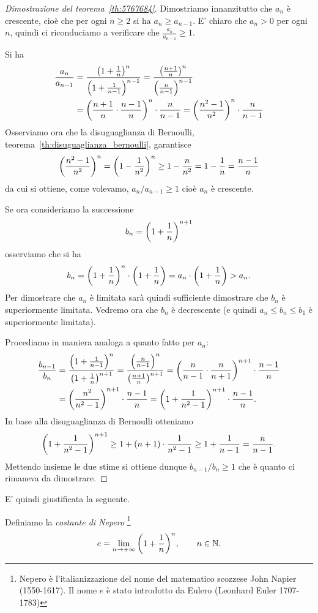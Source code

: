 \begin{proof}[Dimostrazione del teorema~\ref{th:5767684}]
Dimostriamo innanzitutto che $a_n$ è crescente, cioè che
per ogni $n\ge 2$ si ha $a_n \ge a_{n-1}$.
E' chiaro che $a_n>0$ per ogni $n$,
quindi ci riconduciamo a
verificare che $\frac{a_n}{a_{n-1}} \ge 1$.

Si ha
\begin{align*}
\frac{a_n}{a_{n-1}}
&= \frac{{\left( 1+\frac 1 n \right)}^n}{{\left( 1+\frac 1 {n-1} \right)}^{n-1}}
= \frac{{\left( \frac{n+1}{n} \right)}^n}{{\left( \frac{n}{n-1} \right)}^{n-1}}\\
&= {\left( \frac{n+1}{n}\cdot\frac{n-1}{n} \right)}^n \cdot \frac{n}{n-1}
= {\left( \frac{n^2- 1}{n^2} \right)}^n \cdot \frac{n}{n-1}
\end{align*}
Osserviamo ora che la disuguaglianza di Bernoulli, 
teorema~\ref{th:disuguaglianza_bernoulli},
garantisce
\[
  {\left( \frac{n^2 -1}{n^2} \right)}^n
  = {\left( 1-\frac{1}{n^2} \right)}^n
  \ge 1 - \frac{n}{n^2} = 1 - \frac{1}{n} = \frac{n-1}{n}
\]
da cui si ottiene, come volevamo, $a_n / a_{n-1} \ge 1$ cioè
$a_n$ è crescente.

Se ora consideriamo la successione
\[
  b_n = {\left( 1+\frac 1 n \right)}^{n+1}
\]
osserviamo che si ha
\[
  b_n = {\left( 1+\frac 1 n \right)}^n \cdot {\left( 1+\frac 1 n \right)}
   = a_n\cdot {\left( 1+\frac 1 n \right)} > a_n.
\]
Per dimostrare che $a_n$ è limitata sarà quindi sufficiente dimostrare
che $b_n$ è superiormente limitata. Vedremo ora che $b_n$ è decrescente (e quindi $a_n \le b_n \le b_1$ è superiormente limitata).

Procediamo in maniera analoga a quanto fatto per $a_n$:
\begin{align*}
\frac{b_{n-1}}{b_n}
& = \frac{{\left( 1+\frac{1}{n-1} \right)}^n}{{\left( 1+\frac{1}{n} \right)}^{n+1}}
  = \frac{{\left( \frac{n}{n-1} \right)}^n}{{\left( \frac{n+1}{n} \right)}^{n+1}}
  = {\left( \frac{n}{n-1}\cdot\frac{n}{n+1} \right)}^{n+1}\cdot\frac{n-1}{n} \\
& = {\left( \frac{n^2}{n^2-1} \right)}^{n+1} \cdot \frac{n-1}{n}
  = {\left( 1 + \frac{1}{n^2-1} \right)}^{n+1} \cdot \frac{n-1}{n}.
\end{align*}
In base alla disuguaglianza di Bernoulli otteniamo
\[
  {\left( 1 + \frac{1}{n^2-1} \right)}^{n+1}
  \ge 1 + (n+1) \cdot \frac{1}{n^2-1}
  \ge 1 + \frac{1}{n-1} = \frac{n}{n-1}.
\]
Mettendo insieme le due stime si ottiene dunque $b_{n-1}/b_n \ge 1$
che è quanto ci rimaneva da dimostrare.
\end{proof}

E' quindi giustificata la seguente.

\begin{definition}
\mymark{***}
Definiamo la \emph{costante di Nepero}%
%
%
%
\footnote{Nepero è l'italianizzazione del nome del
matematico scozzese John Napier (1550-1617).
Il nome $e$ è stato introdotto da Eulero (Leonhard Euler 1707-1783)
}
\[
  e = \lim_{n\to +\infty} {\left( 1+\frac 1 n \right)}^n,
  \qquad n\in\mathbb N.
\]
\end{definition}

